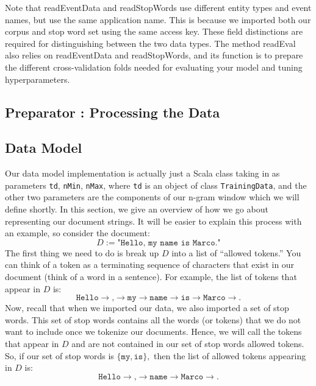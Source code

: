 \documentclass[a4paper,12pt]{article}
\renewcommand{\tt}[1]{\texttt{#1}}
\newcommand{\3}{\left}
\newcommand{\4}{\right}
\renewcommand{\-}[1]{{}^{-#1}}
\begin{document}
Note that readEventData and readStopWords use different entity types and event names, but use the same application name. This is because we imported both our corpus and stop word set using the same access key. These field distinctions are required for distinguishing between the two data types. The method readEval also relies on readEventData and readStopWords, and its function is to prepare the different cross-validation folds needed for evaluating your model and tuning hyperparameters. 

\break

\subsection*{\normalsize Preparator : Processing the Data}

\subsection*{\normalsize Data Model}

Our data model implementation is actually just a Scala class taking in as parameters \tt{td}, \tt{nMin}, \tt{nMax}, where \tt{td} is an object of class \tt{TrainingData}, and the other two parameters are the components of our n-gram window which we will define shortly. In this section, we give an overview of how we go about representing our document strings. It will be easier to explain this process with an example, so consider the document:
$$
D := \tt{"Hello, my name is Marco."}
$$
The first thing we need to do is break up $D$ into a list of \enquote{allowed tokens.} You can think of a token as a terminating sequence of characters that exist in our document (think of a word in a sentence). For example, the list of tokens that appear in $D$ is:
$$
\tt{Hello} \to \tt{,} \to \tt{my} \to \tt{name} \to \tt{is} \to \tt{Marco} \to \tt{.}
$$
Now, recall that when we imported our data, we also imported a set of stop words. This set of stop words contains all the words (or tokens) that we do not want to include once we tokenize our documents. Hence, we will call the tokens that appear in $D$ and are not contained in our set of stop words allowed tokens. So, if our set of stop words is $\{\tt{my}, \tt{is}\},$ then the list of allowed tokens appearing in $D$ is:
$$
\tt{Hello} \to \tt{,} \to \tt{name} \to \tt{Marco} \to \tt{.}
$$
\end{document}
